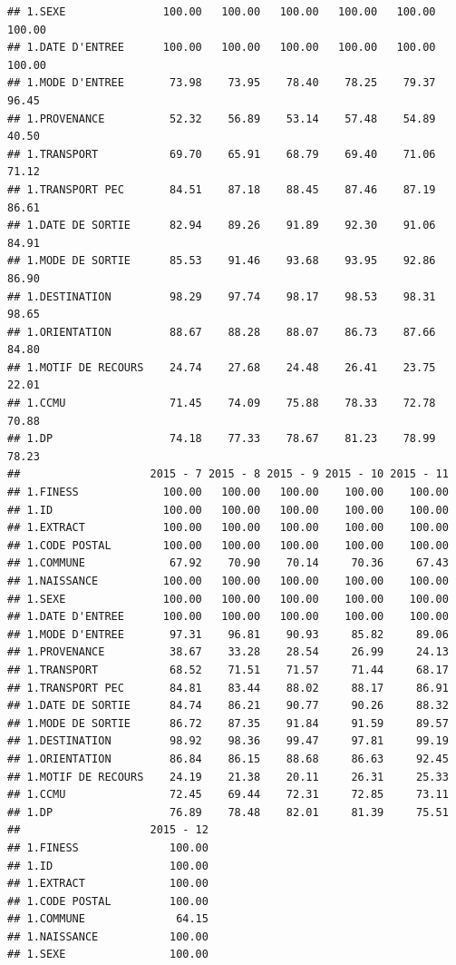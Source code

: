 \documentclass[]{article}
\begin{document}
\begin{verbatim}
## 1.SEXE               100.00   100.00   100.00   100.00   100.00   100.00
## 1.DATE D'ENTREE      100.00   100.00   100.00   100.00   100.00   100.00
## 1.MODE D'ENTREE       73.98    73.95    78.40    78.25    79.37    96.45
## 1.PROVENANCE          52.32    56.89    53.14    57.48    54.89    40.50
## 1.TRANSPORT           69.70    65.91    68.79    69.40    71.06    71.12
## 1.TRANSPORT PEC       84.51    87.18    88.45    87.46    87.19    86.61
## 1.DATE DE SORTIE      82.94    89.26    91.89    92.30    91.06    84.91
## 1.MODE DE SORTIE      85.53    91.46    93.68    93.95    92.86    86.90
## 1.DESTINATION         98.29    97.74    98.17    98.53    98.31    98.65
## 1.ORIENTATION         88.67    88.28    88.07    86.73    87.66    84.80
## 1.MOTIF DE RECOURS    24.74    27.68    24.48    26.41    23.75    22.01
## 1.CCMU                71.45    74.09    75.88    78.33    72.78    70.88
## 1.DP                  74.18    77.33    78.67    81.23    78.99    78.23
##                    2015 - 7 2015 - 8 2015 - 9 2015 - 10 2015 - 11
## 1.FINESS             100.00   100.00   100.00    100.00    100.00
## 1.ID                 100.00   100.00   100.00    100.00    100.00
## 1.EXTRACT            100.00   100.00   100.00    100.00    100.00
## 1.CODE POSTAL        100.00   100.00   100.00    100.00    100.00
## 1.COMMUNE             67.92    70.90    70.14     70.36     67.43
## 1.NAISSANCE          100.00   100.00   100.00    100.00    100.00
## 1.SEXE               100.00   100.00   100.00    100.00    100.00
## 1.DATE D'ENTREE      100.00   100.00   100.00    100.00    100.00
## 1.MODE D'ENTREE       97.31    96.81    90.93     85.82     89.06
## 1.PROVENANCE          38.67    33.28    28.54     26.99     24.13
## 1.TRANSPORT           68.52    71.51    71.57     71.44     68.17
## 1.TRANSPORT PEC       84.81    83.44    88.02     88.17     86.91
## 1.DATE DE SORTIE      84.74    86.21    90.77     90.26     88.32
## 1.MODE DE SORTIE      86.72    87.35    91.84     91.59     89.57
## 1.DESTINATION         98.92    98.36    99.47     97.81     99.19
## 1.ORIENTATION         86.84    86.15    88.68     86.63     92.45
## 1.MOTIF DE RECOURS    24.19    21.38    20.11     26.31     25.33
## 1.CCMU                72.45    69.44    72.31     72.85     73.11
## 1.DP                  76.89    78.48    82.01     81.39     75.51
##                    2015 - 12
## 1.FINESS              100.00
## 1.ID                  100.00
## 1.EXTRACT             100.00
## 1.CODE POSTAL         100.00
## 1.COMMUNE              64.15
## 1.NAISSANCE           100.00
## 1.SEXE                100.00

\end{verbatim}
\end{document}

